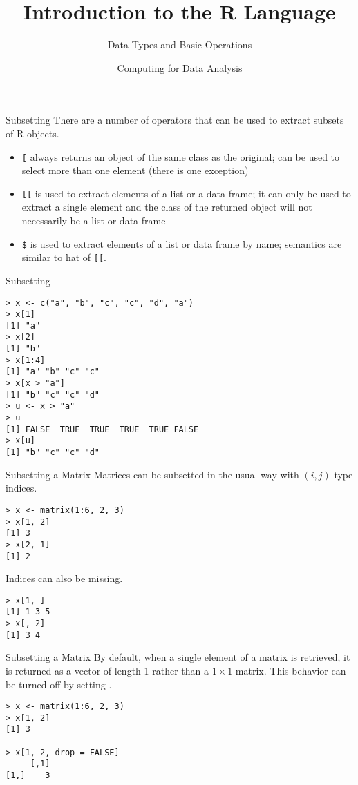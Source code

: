 \documentclass[aspectratio=169]{beamer}
\title[The R Language]{Introduction to the R Language}
\subtitle{Data Types and Basic Operations}
\date{Computing for Data Analysis}
\begin{document}
\begin{frame}
  \titlepage
\end{frame}








\begin{frame}[fragile]{Subsetting}
There are a number of operators that can be used to extract subsets of
R objects.
\begin{itemize}
\item
\verb+[+ always returns an object of the same class as the original;
can be used to select more than one element (there is one exception)
\item
\verb+[[+ is used to extract elements of a list or a data frame; it
can only be used to extract a single element and the class of the
returned object will not necessarily be a list or data frame
\item
\verb+$+ is used to extract elements of a list or data frame by name;
semantics are similar to hat of \verb+[[+.
\end{itemize}
\end{frame}

\begin{frame}[fragile]{Subsetting}
\begin{verbatim}
> x <- c("a", "b", "c", "c", "d", "a")
> x[1]
[1] "a"
> x[2]
[1] "b"
> x[1:4]
[1] "a" "b" "c" "c"
> x[x > "a"]
[1] "b" "c" "c" "d"
> u <- x > "a"
> u
[1] FALSE  TRUE  TRUE  TRUE  TRUE FALSE
> x[u]
[1] "b" "c" "c" "d"
\end{verbatim}
\end{frame}

\begin{frame}[fragile]{Subsetting a Matrix}
Matrices can be subsetted in the usual way with $(i, j)$ type indices.
\begin{verbatim}
> x <- matrix(1:6, 2, 3)
> x[1, 2]
[1] 3
> x[2, 1]
[1] 2
\end{verbatim}
Indices can also be missing.
\begin{verbatim}
> x[1, ]
[1] 1 3 5
> x[, 2]
[1] 3 4
\end{verbatim}
\end{frame}

\begin{frame}[fragile]{Subsetting a Matrix}
By default, when a single element of a matrix is retrieved, it is
returned as a vector of length 1 rather than a $1\times 1$ matrix.
This behavior can be turned off by setting .
\begin{verbatim}
> x <- matrix(1:6, 2, 3)
> x[1, 2]
[1] 3

> x[1, 2, drop = FALSE]
     [,1]
[1,]    3
\end{verbatim}
\end{frame}
\end{document}
